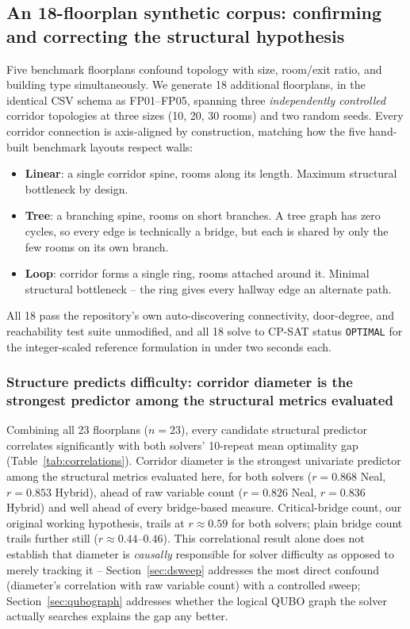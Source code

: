 \documentclass[11pt]{article}
\begin{document}
\subsection{An 18-floorplan synthetic corpus: confirming and correcting the structural hypothesis}
\label{sec:synthetic}
Five benchmark floorplans confound topology with size, room/exit ratio, and building type simultaneously. We generate 18 additional floorplans, in the identical CSV schema as FP01--FP05, spanning three \emph{independently controlled} corridor topologies at three sizes (10, 20, 30 rooms) and two random seeds. Every corridor connection is axis-aligned by construction, matching how the five hand-built benchmark layouts respect walls:
\begin{itemize}[leftmargin=*]
\item \textbf{Linear}: a single corridor spine, rooms along its length. Maximum structural bottleneck by design.
\item \textbf{Tree}: a branching spine, rooms on short branches. A tree graph has zero cycles, so every edge is technically a bridge, but each is shared by only the few rooms on its own branch.
\item \textbf{Loop}: corridor forms a single ring, rooms attached around it. Minimal structural bottleneck -- the ring gives every hallway edge an alternate path.
\end{itemize}
All 18 pass the repository's own auto-discovering connectivity, door-degree, and reachability test suite unmodified, and all 18 solve to CP-SAT status \texttt{OPTIMAL} for the integer-scaled reference formulation in under two seconds each.

\subsubsection{Structure predicts difficulty: corridor diameter is the strongest predictor among the structural metrics evaluated}
\label{sec:v4-diagonal}

Combining all 23 floorplans ($n=23$), every candidate structural predictor correlates significantly with both solvers' 10-repeat mean optimality gap (Table~\ref{tab:correlations}). Corridor diameter is the strongest univariate predictor among the structural metrics evaluated here, for both solvers ($r=0.868$ Neal, $r=0.853$ Hybrid), ahead of raw variable count ($r=0.826$ Neal, $r=0.836$ Hybrid) and well ahead of every bridge-based measure. Critical-bridge count, our original working hypothesis, trails at $r\approx0.59$ for both solvers; plain bridge count trails further still ($r\approx0.44$--$0.46$). This correlational result alone does not establish that diameter is \emph{causally} responsible for solver difficulty as opposed to merely tracking it -- Section~\ref{sec:dsweep} addresses the most direct confound (diameter's correlation with raw variable count) with a controlled sweep; Section~\ref{sec:qubograph} addresses whether the logical QUBO graph the solver actually searches explains the gap any better.
\end{document}
